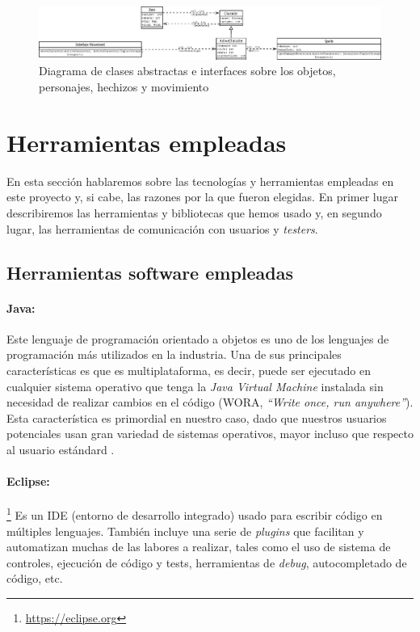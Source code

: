 \begin{figure}
    \includegraphics[width=\textwidth,height=0.15\textwidth]{./img/charactersitems.png}
	\caption{Diagrama de clases abstractas e interfaces sobre los objetos, personajes, hechizos y movimiento}
	\label{fig:charactersitems}
\end{figure}

\section{Herramientas empleadas}

En esta sección hablaremos sobre las tecnologías y herramientas empleadas en este proyecto y, si cabe, las razones por la que fueron elegidas. En primer lugar describiremos las herramientas y bibliotecas que hemos usado y, en segundo lugar, las herramientas de comunicación con usuarios y \textit{testers}.

\subsection{Herramientas software empleadas}

\paragraph{Java:} Este lenguaje de programación orientado a objetos es uno de los lenguajes de programación más utilizados en la industria. Una de sus principales características es que es multiplataforma, es decir, puede ser ejecutado en cualquier sistema operativo que tenga la \textit{Java Virtual Machine} instalada sin necesidad de realizar cambios en el código (WORA, \textit{``Write once, run anywhere''}). Esta característica es primordial en nuestro caso, dado que nuestros usuarios potenciales usan gran variedad de sistemas operativos, mayor incluso que respecto al usuario estándard	.

 \paragraph{Eclipse:}\footnote{\url{https://eclipse.org}} Es un IDE (entorno de desarrollo integrado) usado para escribir código en múltiples lenguajes. También incluye una serie de \textit{plugins} que facilitan y automatizan muchas de las labores a realizar, tales como el uso de sistema de controles, ejecución de código y tests, herramientas de \textit{debug}, autocompletado de código, etc.

